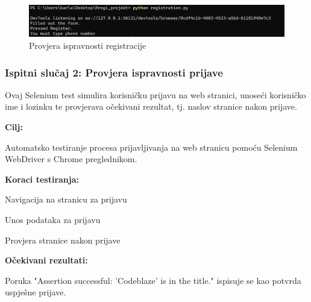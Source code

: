 						\begin{figure} [H]
							\centering
							\includegraphics[width=0.7\linewidth]{slike/RegisterSeleniumOutput.png}
							\caption{Provjera ispravnosti registracije}
							\label{fig:Provjera ispravnosti registracije}
						\end{figure}

                        


            \subsubsection{Ispitni slučaj 2: Provjera ispravnosti prijave}

                        Ovaj Selenium test simulira korisničku prijavu na web stranici, unoseći korisničko ime i lozinku te provjerava očekivani rezultat, tj. naslov stranice nakon prijave.
                        
                        \noindent\textbf{Cilj:}
                        \begin{packed_item}
                        	\item Automatsko testiranje procesa prijavljivanja na web stranicu pomoću Selenium WebDriver s Chrome preglednikom.
                        \end{packed_item}
                        
                        \noindent\textbf{Koraci testiranja:}
                        \begin{packed_item}
                        	\item Navigacija na stranicu za prijavu
                        	\item  Unos podataka za prijavu
                        	\item Provjera stranice nakon prijave
                        	
                        \end{packed_item}
                        \noindent\textbf{Očekivani rezultati:}
                        \begin{packed_item}
                        	\item  Poruka "Assertion successful: 'Codeblaze' is in the title." ispisuje se kao potvrda uspješne prijave.
                        \end{packed_item}
                                                             

